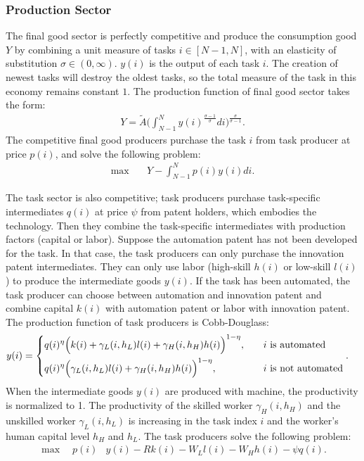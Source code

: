 \documentclass[12pt]{article}
\begin{document}
\subsubsection*{Production Sector}

The final good sector is perfectly competitive and produce the consumption good $Y$ by combining a unit measure of tasks $i\in [N-1,N]$, with an elasticity of substitution $\sigma \in (0,\infty)$. $y(i)$ is the output of each task $i$. The creation of newest tasks will destroy the oldest tasks, so the total measure of the task in this economy remains constant $1$. The production function of final good sector takes the form:
\begin{align*}
Y = \tilde{A}\Big(\int_{N-1}^{N}y(i)^{\frac{\sigma-1}{\sigma}}di\Big)^{\frac{\sigma}{\sigma-1}}.
\end{align*}
The competitive final good producers purchase the task $i$ from task producer at price $p(i)$, and solve the following problem:
\begin{align*}
\max \quad & Y-\int_{N-1}^Np(i)y(i)di. 
\end{align*}

The task sector is also competitive; task producers purchase task-specific intermediates $q(i)$ at price $\psi$ from patent holders, which embodies the technology. Then they combine the task-specific intermediates with production factors (capital or labor). Suppose the automation patent has not been developed for the task. In that case, the task producers can only purchase the innovation patent intermediates. They can only use labor (high-skill $h(i)$ or low-skill $l(i)$) to produce the intermediate goods $y(i)$. If the task has been automated, the task producer can choose between automation and innovation patent and combine capital $k(i)$ with automation patent or labor with innovation patent. The production function of task producers is Cobb-Douglass:
\begin{align*}
y(i) &= 
\begin{dcases}
q(i)^{\eta}\Big(k(i) + \gamma_L(i,h_L)l(i)+\gamma_H(i,h_H)h(i)\Big)^{1-\eta} , &\quad \text{$i$ is automated}  \\
q(i)^{\eta}\Big(\gamma_L(i,h_L)l(i)+\gamma_H(i,h_H)h(i)\Big)^{1-\eta} ,&\quad \text{$i$ is not automated}
\end{dcases}. 
\end{align*}
When the intermediate goods $y(i)$ are produced with machine, the productivity is normalized to 1. The productivity of the skilled worker $\gamma_H(i,h_H)$ and the unskilled worker $\gamma_L(i,h_L)$ is increasing in the task index $i$ and the worker's human capital level $h_H$ and $h_L$. 
The task producers solve the following problem:
\begin{align*}
\max \quad  p(i)&y(i)-Rk(i)-W_Ll(i)-W_Hh(i)-\psi q(i).
\end{align*}
\end{document}
